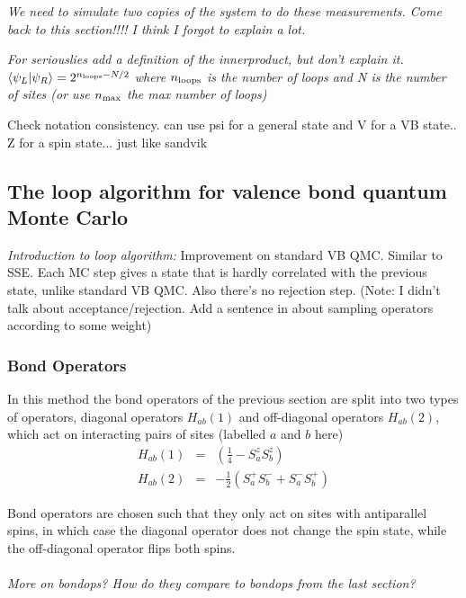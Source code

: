 \documentclass[prb,aps,twocolumn,floatfix,amsmath,amssymb,superscriptaddress,tightenlines]{revtex4}
\begin{document}
{\it We need to simulate two copies of the system to do these measurements.  
Come back to this section!!!!  I think I forgot to explain a lot. }

{\it For seriouslies add a definition of the innerproduct, but don't explain it.  
$\langle \psi_L \rvert \psi_R \rangle = 2^{n_{\rm loops} - N/2}$ where $n_{\rm loops}$ is the number
of loops and N is the number of sites  (or use $n_{\rm max}$ the max number of loops)

Check notation consistency.  can use psi for a general state and V for a VB state.. Z for a spin state... just like sandvik
}

\subsection{The loop algorithm for valence bond quantum Monte Carlo}

{\it Introduction to loop algorithm:}
Improvement on standard VB QMC.  Similar to SSE.  Each MC step gives a state that is hardly correlated with the previous state, unlike standard VB QMC.  Also there's no rejection step.  (Note: I didn't talk about acceptance/rejection.  Add a sentence in about sampling operators according to some weight)

\subsubsection{Bond Operators}

In this method the bond operators of the previous section are split into two types of  operators, diagonal operators $H_{ab}(1)$ and off-diagonal operators $H_{ab}(2)$, which act on interacting pairs of sites (labelled $a$ and $b$ here)
\begin{eqnarray}
	H_{ab}(1) &=&(\tfrac{1}{4} - S^z_aS^z_b) \\
	H_{ab}(2) &=& %
		        -\tfrac{1}{2}(S_a^+S_b^- + S_a^-S_b^+)
\end{eqnarray}

Bond operators are chosen such that they only act on sites with antiparallel spins, in which case the diagonal operator does not change the spin state, while the off-diagonal operator  flips both spins.
\\\\{\it More on bondops? How do they compare to bondops from the last section?}
\\
\end{document}
